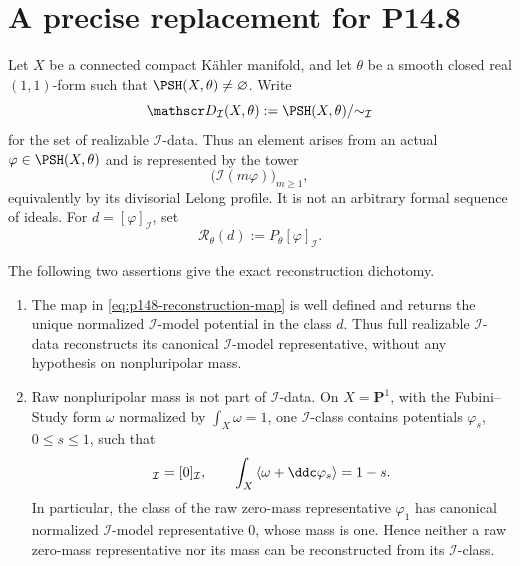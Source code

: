 \section{A precise replacement for P14.8}
\label{sec:p148-precise-replacement}

Let \(X\) be a connected compact K\"ahler manifold, and let
\(\theta\) be a smooth closed real \((1,1)\)-form such that
\(\PSH(X,\theta)\neq\varnothing\).  Write
\[
 \mathscr D_{\mathcal I}(X,\theta)
 :=\PSH(X,\theta)/{\sim_{\mathcal I}}
\]
for the set of realizable \(\mathcal I\)-data.  Thus an element arises from
an actual \(\varphi\in\PSH(X,\theta)\) and is represented by the tower
\[
 \bigl(\mathcal I(m\varphi)\bigr)_{m\geq1},
\]
equivalently by its divisorial Lelong profile.  It is not an arbitrary
formal sequence of ideals.  For
\(d=[\varphi]_{\mathcal I}\), set
\begin{equation}
 \mathcal R_\theta(d):=P_\theta[\varphi]_{\mathcal I}.
 \label{eq:p148-reconstruction-map}
\end{equation}

\begin{theorem}
\label{thm:p148-reconstruction-dichotomy}
The following two assertions give the exact reconstruction dichotomy.

\begin{enumerate}
\item The map in \eqref{eq:p148-reconstruction-map} is well defined and
returns the unique normalized \(\mathcal I\)-model potential in the class
\(d\).  Thus full realizable \(\mathcal I\)-data reconstructs its canonical
\(\mathcal I\)-model representative, without any hypothesis on
nonpluripolar mass.

\item Raw nonpluripolar mass is not part of \(\mathcal I\)-data.  On
\(X=\mathbf P^1\), with the Fubini--Study form \(\omega\) normalized by
\(\int_X\omega=1\), one \(\mathcal I\)-class contains potentials
\(\varphi_s\), \(0\leq s\leq1\), such that
\begin{equation}
 [\varphi_s]_{\mathcal I}=[0]_{\mathcal I},
 \qquad
 \int_X\left\langle\omega+\ddc\varphi_s\right\rangle=1-s.
 \label{eq:p148-same-data-all-masses}
\end{equation}
In particular, the class of the raw zero-mass representative
\(\varphi_1\) has canonical normalized \(\mathcal I\)-model representative
\(0\), whose mass is one.  Hence neither a raw zero-mass representative nor
its mass can be reconstructed from its \(\mathcal I\)-class.
\end{enumerate}
\end{theorem}

